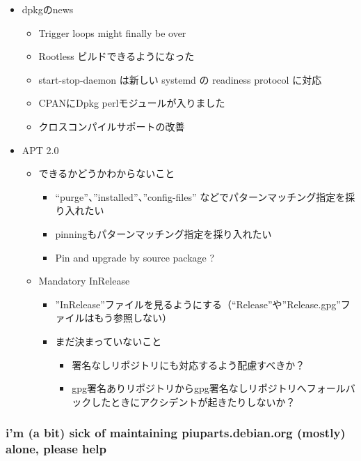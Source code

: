 \documentclass[mingoth,a4paper]{jsarticle}
\begin{document}
\begin{itemize}
\begin{itemize}
  \end{itemize}
\item dpkgのnews
  \begin{itemize}
  \item Trigger loops might finally be over
  \item Rootless ビルドできるようになった
  \item start-stop-daemon は新しい systemd の readiness protocol に対応
  \item CPANにDpkg perlモジュールが入りました
  \item クロスコンパイルサポートの改善    
  \end{itemize}
\item APT 2.0
  \begin{itemize}
  \item できるかどうかわからないこと
    \begin{itemize}
    \item ``purge''、''installed''、''config-files'' などでパターンマッチング指定を採り入れたい
    \item pinningもパターンマッチング指定を採り入れたい
    \item Pin and upgrade by source package ?
    \end{itemize}
  \item Mandatory InRelease
    \begin{itemize}
    \item ''InRelease''ファイルを見るようにする（``Release''や''Release.gpg''ファイルはもう参照しない）
    \item まだ決まっていないこと
      \begin{itemize}
      \item 署名なしリポジトリにも対応するよう配慮すべきか？
      \item gpg署名ありリポジトリからgpg署名なしリポジトリへフォールバックしたときにアクシデントが起きたりしないか？
      \end{itemize}
    \end{itemize}
  \end{itemize}
\end{itemize}


\subsubsection{i'm (a bit) sick of maintaining piuparts.debian.org (mostly) alone, please help}
\end{document}

